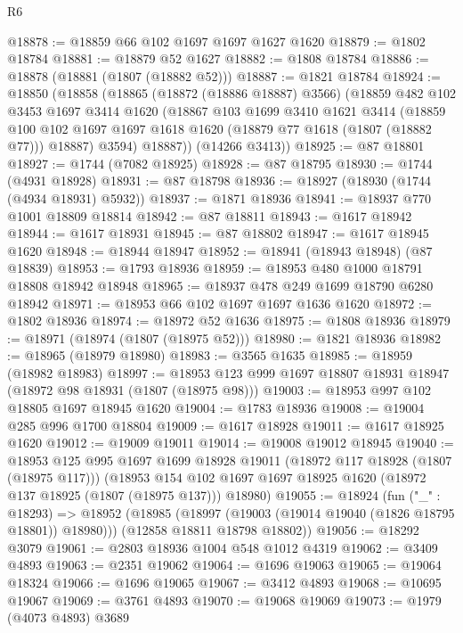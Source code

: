 \begin{lexlean}{R6}
\begin{coremodule}
@18878 := @18859 @66 @102 @1697 @1697 @1627 @1620
@18879 := @1802 @18784
@18881 := @18879 @52 @1627
@18882 := @1808 @18784
@18886 := @18878 (@18881 (@1807 (@18882 @52)))
@18887 := @1821 @18784
@18924 := @18850
    (@18858
      (@18865
        (@18872 (@18886 @18887) @3566)
        (@18859
          @482
          @102
          @3453
          @1697
          @3414
          @1620
          (@18867
            @103
            @1699
            @3410
            @1621
            @3414
            (@18859
              @100
              @102
              @1697
              @1697
              @1618
              @1620
              (@18879 @77 @1618 (@1807 (@18882 @77)))
              @18887)
            @3594)
          @18887))
      (@14266 @3413))
@18925 := @87 @18801
@18927 := @1744 (@7082 @18925)
@18928 := @87 @18795
@18930 := @1744 (@4931 @18928)
@18931 := @87 @18798
@18936 := @18927 (@18930 (@1744 (@4934 @18931) @5932))
@18937 := @1871 @18936
@18941 := @18937 @770 @1001 @18809 @18814
@18942 := @87 @18811
@18943 := @1617 @18942
@18944 := @1617 @18931
@18945 := @87 @18802
@18947 := @1617 @18945 @1620
@18948 := @18944 @18947
@18952 := @18941 (@18943 @18948) (@87 @18839)
@18953 := @1793 @18936
@18959 := @18953 @480 @1000 @18791 @18808 @18942 @18948
@18965 := @18937 @478 @249 @1699 @18790 @6280 @18942
@18971 := @18953 @66 @102 @1697 @1697 @1636 @1620
@18972 := @1802 @18936
@18974 := @18972 @52 @1636
@18975 := @1808 @18936
@18979 := @18971 (@18974 (@1807 (@18975 @52)))
@18980 := @1821 @18936
@18982 := @18965 (@18979 @18980)
@18983 := @3565 @1635
@18985 := @18959 (@18982 @18983)
@18997 := @18953 @123 @999 @1697 @18807 @18931 @18947 (@18972 @98 @18931 (@1807 (@18975 @98)))
@19003 := @18953 @997 @102 @18805 @1697 @18945 @1620
@19004 := @1783 @18936
@19008 := @19004 @285 @996 @1700 @18804
@19009 := @1617 @18928
@19011 := @1617 @18925 @1620
@19012 := @19009 @19011
@19014 := @19008 @19012 @18945
@19040 := @18953
    @125
    @995
    @1697
    @1699
    @18928
    @19011
    (@18972 @117 @18928 (@1807 (@18975 @117)))
    (@18953 @154 @102 @1697 @1697 @18925 @1620 (@18972 @137 @18925 (@1807 (@18975 @137))) @18980)
@19055 := @18924
    (fun ("_" : @18293) =>
    @18952
      (@18985 (@18997 (@19003 (@19014 @19040 (@1826 @18795 @18801)) @18980)))
      (@12858 @18811 @18798 @18802))
@19056 := @18292 @3079
@19061 := @2803 @18936 @1004 @548 @1012 @4319
@19062 := @3409 @4893
@19063 := @2351 @19062
@19064 := @1696 @19063
@19065 := @19064 @18324
@19066 := @1696 @19065
@19067 := @3412 @4893
@19068 := @10695 @19067
@19069 := @3761 @4893
@19070 := @19068 @19069
@19073 := @1979 (@4073 @4893) @3689

\end{coremodule}
\end{lexlean}
